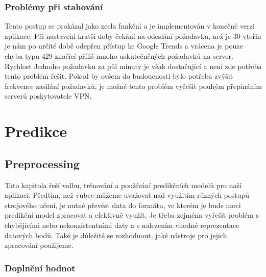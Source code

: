 \subsection{Problémy při stahování}

Tento postup se prokázal jako zcela funkční a je implementován v konečné verzi aplikace. 
Při nastavení kratší doby čekání na odeslání požadavku, než je 30 vteřin je nám po určité době odepřen přístup ke Google Trends a vrácena je pouze chyba typu 429 značící příliš mnoho uskutečněných požadavků na server. 
Rychlost Jednoho požadavku za půl minuty je však dostačující a není zde potřeba tento problém řešit. 
Pokud by ovšem do budoucnosti bylo potřeba zvýšit frekvence zasílání požadavků, je možné tento problém vyřešit pouhým přepínáním serverů poskytovatele VPN.

\chapter{Predikce}

\section{Preprocessing}

Tato kapitola řeší volbu, trénování a používání predikčních modelů pro naší aplikaci.
Předtím, než vůbec můžeme uvažovat nad využitím různých postupů strojového učení, je nutné převést data do formátu, ve kterém je bude moci predikční model zpracovat a efektivně využít. 
Je třeba zejména vyřešit problém s chybějícími nebo nekonzistentními daty a s nalezením vhodné reprezentace datových bodů. 
Také je důležité se rozhodnout, jaké nástroje pro jejich zpracování použijeme.

\subsection{Doplnění hodnot}

